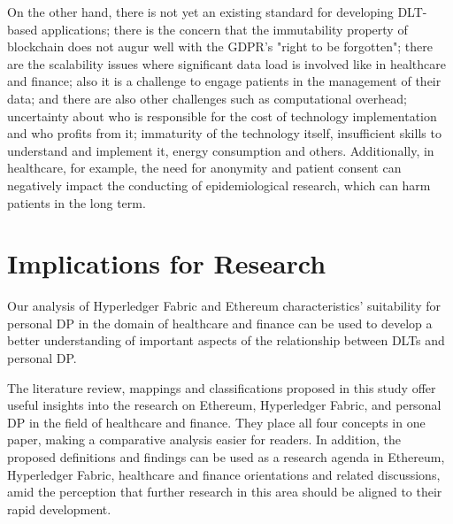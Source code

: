On the other hand, there is not yet an existing standard for developing DLT-based applications; there is the concern that the immutability property of blockchain does not augur well with the GDPR's "right to be forgotten"; there are the scalability issues where significant data load is involved like in healthcare and finance; also it is a challenge to engage patients in the management of their data; and there are also other challenges such as computational overhead; uncertainty about who is responsible for the cost of technology implementation and who profits from it; immaturity of the technology itself, insufficient skills to understand and implement it, energy consumption and others. Additionally, in healthcare, for example, the need for anonymity and patient consent can negatively impact the conducting of epidemiological research, which can harm patients in the long term.

\section{Implications for Research}
\label{sec:ImplicationsForResearch}

Our analysis of Hyperledger Fabric and Ethereum characteristics' suitability for personal DP in the domain of healthcare and finance can be used to develop a better understanding of important aspects of the relationship between DLTs and personal DP. 

The literature review, mappings and classifications proposed in this study offer useful insights into the research on Ethereum, Hyperledger Fabric, and personal DP in the field of healthcare and finance. They place all four concepts in one paper, making a comparative analysis easier for readers. In addition, the proposed definitions and findings can be used as a research agenda in Ethereum, Hyperledger Fabric, healthcare and finance orientations and related discussions, amid the perception that further research in this area should be aligned to their rapid development. 

